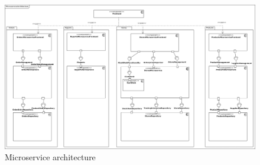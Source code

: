 	
	
	\begin{figure}
	   	\includegraphics[width=\textwidth]{img/MicroserviceArchitecture.jpg}
	   	\caption{Microservice architecture}
	   	\label{MS_ARch}
	\end{figure}
